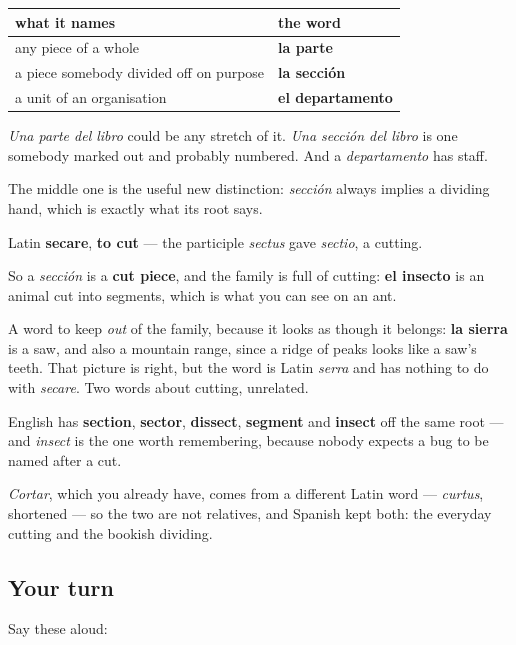 \begin{grammarlens}[title={Grammar Lens: sección, parte, departamento}]
\noindent
\begin{tabularx}{\linewidth}{@{}>{\raggedright\arraybackslash}X>{\raggedright\arraybackslash}X@{}}
\toprule
\textbf{what it names} & \textbf{the word} \\
\midrule
any piece of a whole & \textbf{la parte} \\
a piece somebody divided off on purpose & \textbf{la sección} \\
a unit of an organisation & \textbf{el departamento} \\
\bottomrule
\end{tabularx}

\emph{Una parte del libro} could be any stretch of it. \emph{Una sección del libro} is one somebody marked out and probably numbered. And a \emph{departamento} has staff.

The middle one is the useful new distinction: \emph{sección} always implies a dividing hand, which is exactly what its root says.
\end{grammarlens}

\begin{cousinweb}
Latin \textbf{secare}, \textbf{to cut} — the participle \emph{sectus} gave \emph{sectio}, a cutting.

So a \emph{sección} is a \textbf{cut piece}, and the family is full of cutting: \textbf{el insecto} is an animal cut into segments, which is what you can see on an ant.

A word to keep \emph{out} of the family, because it looks as though it belongs: \textbf{la sierra} is a saw, and also a mountain range, since a ridge of peaks looks like a saw's teeth. That picture is right, but the word is Latin \emph{serra} and has nothing to do with \emph{secare}. Two words about cutting, unrelated.

English has \textbf{section}, \textbf{sector}, \textbf{dissect}, \textbf{segment} and \textbf{insect} off the same root — and \emph{insect} is the one worth remembering, because nobody expects a bug to be named after a cut.

\emph{Cortar}, which you already have, comes from a different Latin word — \emph{curtus}, shortened — so the two are not relatives, and Spanish kept both: the everyday cutting and the bookish dividing.
\end{cousinweb}

\subsection*{Your turn}
Say these aloud:

